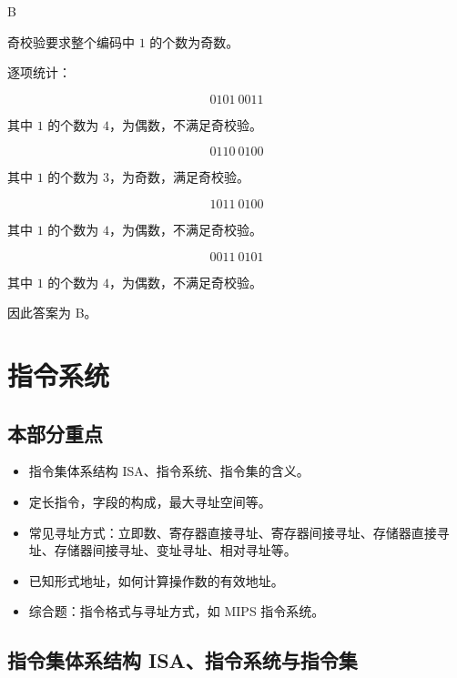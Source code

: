 \begin{answer}
B
\end{answer}

\begin{analysisenv}
奇校验要求整个编码中 $1$ 的个数为奇数。

逐项统计：

\[
0101\ 0011
\]

其中 $1$ 的个数为 $4$，为偶数，不满足奇校验。

\[
0110\ 0100
\]

其中 $1$ 的个数为 $3$，为奇数，满足奇校验。

\[
1011\ 0100
\]

其中 $1$ 的个数为 $4$，为偶数，不满足奇校验。

\[
0011\ 0101
\]

其中 $1$ 的个数为 $4$，为偶数，不满足奇校验。

因此答案为 B。
\end{analysisenv}



\newpage

\section{指令系统}

\subsection*{本部分重点}
\begin{itemize}
    \item 指令集体系结构 ISA、指令系统、指令集的含义。
    \item 定长指令，字段的构成，最大寻址空间等。
    \item 常见寻址方式：立即数、寄存器直接寻址、寄存器间接寻址、存储器直接寻址、存储器间接寻址、变址寻址、相对寻址等。
    \item 已知形式地址，如何计算操作数的有效地址。
    \item 综合题：指令格式与寻址方式，如 MIPS 指令系统。
\end{itemize}

\subsection{指令集体系结构 ISA、指令系统与指令集}

